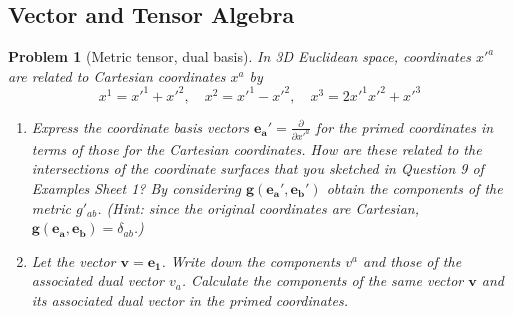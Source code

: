 \documentclass[a4paper]{article}
\theoremstyle{new2}
\theoremstyle{new}
\newtheorem{qns}{Problem}[section]
\begin{document}
\subsection*{Vector and Tensor Algebra}
\begin{qns}[Metric tensor, dual basis]
In 3D Euclidean space, coordinates $x'^a$ are related to Cartesian coordinates $x^a$ by
$$x^1=x'^1+x'^2,\quad  x^2=x'^1-x'^2,\quad x^3=2x'^1x'^2+x'^3$$
\begin{enumerate}[label=(\alph*)]
\item Express the coordinate basis vectors $\mathbf{e_a'}=\frac{\partial}{\partial x'^a}$ for the primed coordinates in terms of those for the Cartesian coordinates. How are these related to the intersections of the coordinate surfaces that you sketched in Question 9 of Examples Sheet 1? By considering $\mathbf{g}(\mathbf{e_a'},\mathbf{e_b'})$ obtain the components of the metric $g'_{ab}$. (Hint: since the original coordinates are Cartesian, $\mathbf{g}(\mathbf{e_a},\mathbf{e_b})=\delta_{ab}$.) 
\item Let the vector $\mathbf{v}=\mathbf{e_1}$. Write down the components $v^a$ and those of the associated dual vector $v_a$. Calculate the components of the same vector $\mathbf{v}$ and its associated dual vector in the primed coordinates. 
\end{enumerate}
\end{qns}
\end{document}
